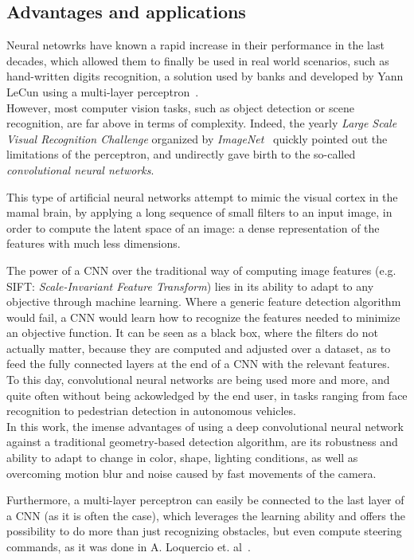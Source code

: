 \subsection{Advantages and applications}

Neural netowrks have known a rapid increase in their performance in the last
decades, which allowed them to finally be used in real world scenarios, such as
hand-written digits recognition, a solution used by banks and developed by Yann
LeCun using a multi-layer perceptron~\cite{41400}.\\

However, most computer vision tasks, such as object detection or scene
recognition, are far above in terms of complexity. Indeed, the yearly
\emph{Large Scale Visual Recognition Challenge} organized by
\emph{ImageNet}~\cite{ILSVRC} quickly pointed out the limitations of the
perceptron, and undirectly gave birth to the so-called \emph{convolutional
neural networks}.

This type of artificial neural networks attempt to mimic the visual cortex in
the mamal brain, by applying a long sequence of small filters to an input
image, in order to compute the latent space of an image: a dense representation
of the features with much less dimensions.

The power of a CNN over the traditional way of computing image features (e.g.
SIFT: \emph{Scale-Invariant Feature Transform}) lies in its ability to adapt to
any objective through machine learning. Where a generic feature detection
algorithm would fail, a CNN would learn how to recognize the features needed to
minimize an objective function. It can be seen as a black box, where the
filters do not actually matter, because they are computed and adjusted over a
dataset, as to feed the fully connected layers at the end of a CNN with the
relevant features.\\

To this day, convolutional neural networks are being used more and more, and
quite often without being ackowledged by the end user, in tasks ranging from
face recognition to pedestrian detection in autonomous vehicles.\\

In this work, the imense advantages of using a deep convolutional neural network
against a traditional geometry-based detection algorithm, are its robustness and
ability to adapt to change in color, shape, lighting conditions, as well as
overcoming motion blur and noise caused by fast movements of the camera.

Furthermore, a multi-layer perceptron can easily be connected to the last layer
of a CNN (as it is often the case), which leverages the learning ability and
offers the possibility to do more than just recognizing obstacles, but even
compute steering commands, as it was done in A. Loquercio et. al~\cite{dronet}.
